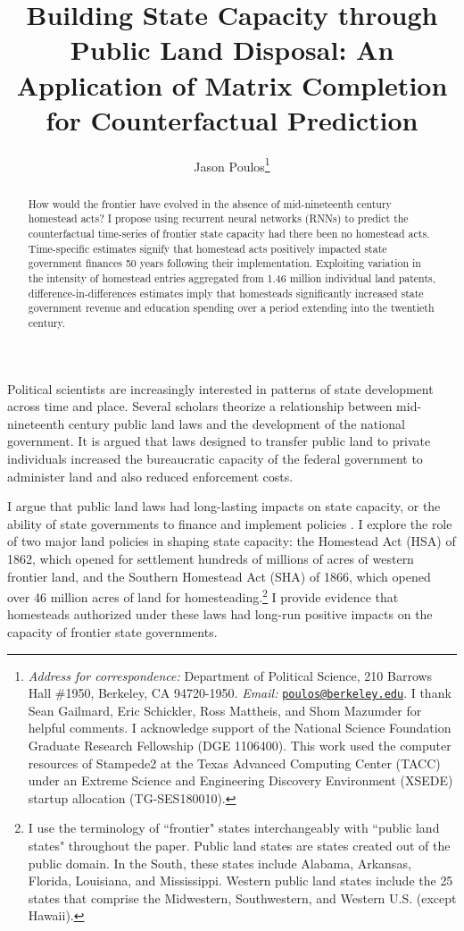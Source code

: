 \documentclass[12pt]{article}
\title{Building State Capacity through Public Land Disposal: An Application of Matrix Completion for Counterfactual Prediction}
\author[ ]{Jason Poulos\thanks{\emph{Address for correspondence:} Department of Political Science, 210 Barrows Hall \#1950, Berkeley, CA 94720-1950. \emph{Email:} \href{mailto:poulos@berkeley.edu}{\nolinkurl{poulos@berkeley.edu}}. I thank Sean Gailmard, Eric Schickler, Ross Mattheis, and Shom Mazumder for helpful comments. I acknowledge support of the National Science Foundation Graduate Research Fellowship (DGE 1106400). This work used the computer resources of Stampede2 at the Texas Advanced Computing Center (TACC) under an Extreme Science and Engineering Discovery Environment (XSEDE) startup allocation (TG-SES180010).}}
\affil[ ]{University of California, Berkeley}
\date{}
\begin{document}
 
 
\begin{singlespacing}
\maketitle  
\end{singlespacing}

\thispagestyle{empty}

\begin{abstract}  
\noindent
How would the frontier have evolved in the absence of mid-nineteenth century homestead acts? I propose using recurrent neural networks (RNNs) to predict the counterfactual time-series of frontier state capacity had there been no homestead acts. Time-specific estimates signify that homestead acts positively impacted state government finances 50 years following their implementation. Exploiting variation in the intensity of homestead entries aggregated from 1.46 million individual land patents, difference-in-differences estimates imply that homesteads significantly increased state government revenue and education spending over a period extending into the twentieth century.\\
\end{abstract}	

\pagebreak
{}%

Political scientists are increasingly interested in patterns of state development across time and place. Several scholars \citep[e.g.,][]{bensel1990,murtazashvili2013political,frymer2014rush} theorize a relationship between mid-nineteenth century public land laws and the development of the national government. It is argued that laws designed to transfer public land to private individuals increased the bureaucratic capacity of the federal government to administer land and also reduced enforcement costs. 

I argue that public land laws had long-lasting impacts on state capacity, or the ability of state governments to finance and implement policies \citep{besley2010state}. I explore the role of two major land policies in shaping state capacity: the Homestead Act (HSA) of 1862, which opened for settlement hundreds of millions of acres of western frontier land, and the Southern Homestead Act (SHA) of 1866, which opened over 46 million acres of land for homesteading.\footnote{I use the terminology of ``frontier" states interchangeably with ``public land states" throughout the paper. Public land states are states created out of the public domain. In the South, these states include Alabama, Arkansas, Florida, Louisiana, and Mississippi. Western public land states include the 25 states that comprise the Midwestern, Southwestern, and Western U.S. (except Hawaii).} I provide evidence that homesteads authorized under these laws had long-run positive impacts on the capacity of frontier state governments. 
\end{document}
